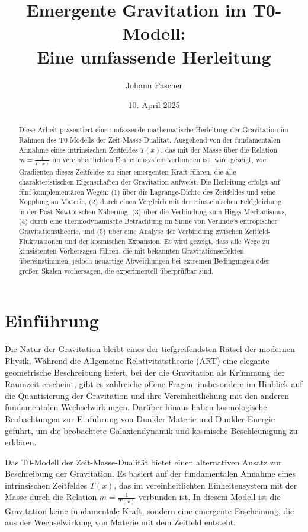 \documentclass[12pt,a4paper]{article}
\title{Emergente Gravitation im T0-Modell: \\ Eine umfassende Herleitung}
\author{Johann Pascher}
\date{10. April 2025}
\newcommand{\Tfield}{T(x)}
\begin{document}
	
	\maketitle
	
	\begin{abstract}
		Diese Arbeit präsentiert eine umfassende mathematische Herleitung der Gravitation im Rahmen des T0-Modells der Zeit-Masse-Dualität. Ausgehend von der fundamentalen Annahme eines intrinsischen Zeitfeldes \(\Tfield\), das mit der Masse über die Relation \(m = \frac{1}{\Tfield}\) im vereinheitlichten Einheitensystem verbunden ist, wird gezeigt, wie Gradienten dieses Zeitfeldes zu einer emergenten Kraft führen, die alle charakteristischen Eigenschaften der Gravitation aufweist. Die Herleitung erfolgt auf fünf komplementären Wegen: (1) über die Lagrange-Dichte des Zeitfeldes und seine Kopplung an Materie, (2) durch einen Vergleich mit der Einstein'schen Feldgleichung in der Post-Newtonschen Näherung, (3) über die Verbindung zum Higgs-Mechanismus, (4) durch eine thermodynamische Betrachtung im Sinne von Verlinde's entropischer Gravitationstheorie, und (5) über eine Analyse der Verbindung zwischen Zeitfeld-Fluktuationen und der kosmischen Expansion. Es wird gezeigt, dass alle Wege zu konsistenten Vorhersagen führen, die mit bekannten Gravitationseffekten übereinstimmen, jedoch neuartige Abweichungen bei extremen Bedingungen oder großen Skalen vorhersagen, die experimentell überprüfbar sind.
	\end{abstract}
	
	\tableofcontents
	
	\section{Einführung}
	
	Die Natur der Gravitation bleibt eines der tiefgreifendsten Rätsel der modernen Physik. Während die Allgemeine Relativitätstheorie (ART) eine elegante geometrische Beschreibung liefert, bei der die Gravitation als Krümmung der Raumzeit erscheint, gibt es zahlreiche offene Fragen, insbesondere im Hinblick auf die Quantisierung der Gravitation und ihre Vereinheitlichung mit den anderen fundamentalen Wechselwirkungen. Darüber hinaus haben kosmologische Beobachtungen zur Einführung von Dunkler Materie und Dunkler Energie geführt, um die beobachtete Galaxiendynamik und kosmische Beschleunigung zu erklären.
	
	Das T0-Modell der Zeit-Masse-Dualität \cite{pascher_galaxies_2025} bietet einen alternativen Ansatz zur Beschreibung der Gravitation. Es basiert auf der fundamentalen Annahme eines intrinsischen Zeitfeldes \(\Tfield\), das im vereinheitlichten Einheitensystem mit der Masse durch die Relation \(m = \frac{1}{\Tfield}\) verbunden ist. In diesem Modell ist die Gravitation keine fundamentale Kraft, sondern eine emergente Erscheinung, die aus der Wechselwirkung von Materie mit dem Zeitfeld entsteht.
	
\end{document}

